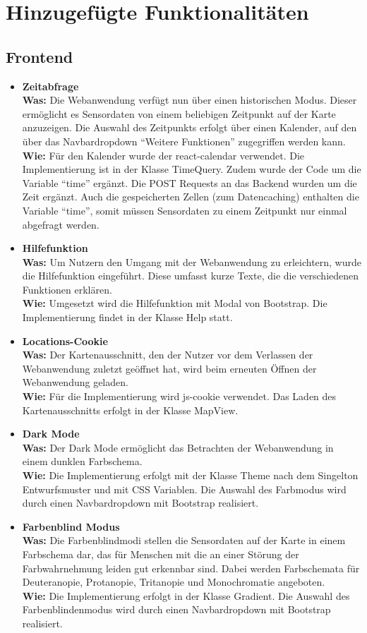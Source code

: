 \section{Hinzugefügte Funktionalitäten}

\subsection{Frontend}
\begin{itemize}
	\item \textbf{Zeitabfrage}
	\\
	\textbf{Was:} Die Webanwendung verfügt nun über einen historischen Modus. Dieser ermöglicht es Sensordaten von einem beliebigen Zeitpunkt auf der Karte anzuzeigen. Die Auswahl des Zeitpunkts erfolgt über einen Kalender, auf den über das Navbardropdown \enquote{Weitere Funktionen} zugegriffen werden kann.
	\\ 
	\textbf{Wie:} Für den Kalender wurde der react-calendar verwendet. Die Implementierung ist in der Klasse TimeQuery. Zudem wurde der Code um die Variable \enquote{time} ergänzt. Die POST Requests an das Backend wurden um die Zeit ergänzt. Auch die gespeicherten Zellen (zum Datencaching) enthalten die Variable \enquote{time}, somit müssen Sensordaten zu einem Zeitpunkt nur einmal abgefragt werden.
	\item \textbf{Hilfefunktion}
	\\
	\textbf{Was:} Um Nutzern den Umgang mit der Webanwendung zu erleichtern, wurde die Hilfefunktion eingeführt. Diese umfasst kurze Texte, die die verschiedenen Funktionen erklären. 
	\\
	\textbf{Wie:} Umgesetzt wird die Hilfefunktion mit Modal von \gls{Bootstrap}. Die Implementierung findet in der Klasse Help statt.
	\item \textbf{Locations-Cookie}
	\\
	\textbf{Was:} Der Kartenausschnitt, den der Nutzer vor dem Verlassen der Webanwendung zuletzt geöffnet hat, wird beim erneuten Öffnen der Webanwendung geladen.
	\\
	\textbf{Wie:} Für die Implementierung wird js-cookie verwendet. Das Laden des Kartenausschnitts erfolgt in der Klasse MapView.
	\item \textbf{Dark Mode}
	\\
	\textbf{Was:} Der Dark Mode ermöglicht das Betrachten der Webanwendung in einem dunklen Farbschema.
	\\
	\textbf{Wie:} Die Implementierung erfolgt mit der Klasse Theme nach dem Singelton Entwurfsmuster und mit CSS Variablen. Die Auswahl des Farbmodus wird durch einen Navbardropdown mit \gls{Bootstrap} realisiert.
	\item \textbf{Farbenblind Modus} 
	\\
	\textbf{Was:} Die Farbenblindmodi stellen die Sensordaten auf der Karte in einem Farbschema dar, das für Menschen mit die an einer Störung der Farbwahrnehmung leiden gut erkennbar sind. Dabei werden Farbschemata für Deuteranopie, Protanopie, Tritanopie und Monochromatie angeboten.
	\\
	\textbf{Wie:} Die Implementierung erfolgt in der Klasse Gradient. Die Auswahl des Farbenblindenmodus wird durch einen Navbardropdown mit \gls{Bootstrap} realisiert.
\end{itemize}
